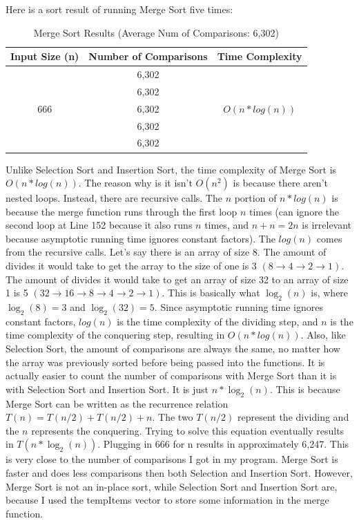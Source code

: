 \documentclass[letterpaper, 10pt]{article}
\begin{document}
Here is a sort result of running Merge Sort five times:
\begin{table}[H]
\centering
\begin{tabular}{|c|c|c|}
\hline
\textbf{Input Size (n)} & \textbf{Number of Comparisons} & \textbf{Time Complexity} \\
\hline
\multirow{5}{*}{666} & 6,302 & \\
                     & 6,302 & \\
                     & 6,302 & $O(n * log(n))$ \\
                     & 6,302 & \\
                     & 6,302 & \\
\hline
\end{tabular}
\caption{Merge Sort Results (Average Num of Comparisons: 6,302)}
\end{table}

\noindent
Unlike Selection Sort and Insertion Sort, the time complexity of Merge Sort is $O(n * log(n))$. The reason why is it isn't $O(n^2)$ is because there aren't nested loops. Instead, there are recursive calls. The $n$ portion of $n * log(n)$ is because the merge function runs through the first loop $n$ times (can ignore the second loop at Line 152 because it also runs $n$ times, and $n + n = 2n$ is irrelevant because asymptotic running time ignores constant factors). The $log(n)$ comes from the recursive calls. Let's say there is an array of size 8. The amount of divides it would take to get the array to the size of one is 3 $(8 \rightarrow 4 \rightarrow 2 \rightarrow 1)$. The amount of divides it would take to get an array of size 32 to an array of size 1 is 5 $(32 \rightarrow 16 \rightarrow 8 \rightarrow 4 \rightarrow 2 \rightarrow 1)$. This is basically what $\log_2(n)$ is, where $\log_2(8) = 3$ and $\log_2(32) = 5$. Since asymptotic running time ignores constant factors, $log(n)$ is the time complexity of the dividing step, and $n$ is the time complexity of the conquering step, resulting in $O(n * log(n))$. Also, like Selection Sort, the amount of comparisons are always the same, no matter how the array was previously sorted before being passed into the functions. It is actually easier to count the number of comparisons with Merge Sort than it is with Selection Sort and Insertion Sort. It is just $n * \log_2(n)$. This is because Merge Sort can be written as the recurrence relation $T(n) = T(n/2) + T(n/2) + n$. The two $T(n/2)$ represent the dividing and the $n$ represents the conquering. Trying to solve this equation eventually results in $T(n * \log_2(n))$. Plugging in 666 for n results in approximately 6,247. This is very close to the number of comparisons I got in my program. Merge Sort is faster and does less comparisons then both Selection and Insertion Sort. However, Merge Sort is not an in-place sort, while Selection Sort and Insertion Sort are, because I used the tempItems vector to store some information in the merge function.
\end{document}
